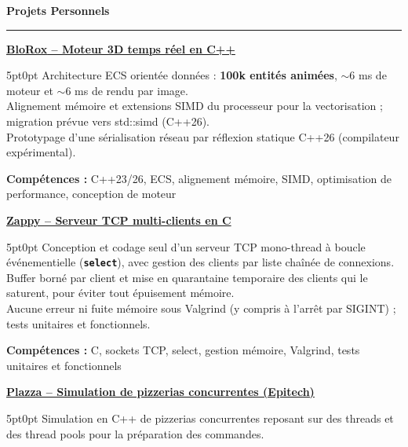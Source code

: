 \documentclass[9pt]{extarticle}
\begin{document}
\par\vspace{5pt}

{\large\bfseries Projets Personnels}
\par\vspace{-8pt}
\rule{\linewidth}{0.4pt}
\par\vspace{5pt}

\underline{\bfseries \href{https://github.com/paulogarithm/blorox}{BloRox} -- Moteur 3D temps réel en C++}
\par
\begin{adjustwidth}{5pt}{0pt}
	Architecture ECS orientée données : {\bfseries 100k entités animées}, $\sim$6 ms de moteur et $\sim$6 ms de rendu par image. \\
	Alignement mémoire et extensions SIMD du processeur pour la vectorisation ; migration prévue vers {\ttfamily std::simd} (C++26). \\
	Prototypage d'une sérialisation réseau par réflexion statique C++26 (compilateur expérimental).
\end{adjustwidth}
\par
{\bfseries Compétences :} C++23/26, ECS, alignement mémoire, SIMD, optimisation de performance, conception de moteur

\par\vspace{8pt}

\underline{\bfseries Zappy -- Serveur TCP multi-clients en C}
\par
\begin{adjustwidth}{5pt}{0pt}
    Conception et codage seul d'un serveur TCP mono-thread à boucle événementielle ({\bfseries \texttt{select}}), avec gestion des clients par liste chaînée de connexions. \\
    Buffer borné par client et mise en quarantaine temporaire des clients qui le saturent, pour éviter tout épuisement mémoire. \\
    Aucune erreur ni fuite mémoire sous Valgrind (y compris à l'arrêt par SIGINT) ; tests unitaires et fonctionnels.
\end{adjustwidth}
\par
{\bfseries Compétences :} C, sockets TCP, select, gestion mémoire, Valgrind, tests unitaires et fonctionnels

\par\vspace{8pt}

\underline{\bfseries Plazza -- Simulation de pizzerias concurrentes (Epitech)}
\par
\begin{adjustwidth}{5pt}{0pt}
    Simulation en C++ de pizzerias concurrentes reposant sur des threads et des thread pools pour la préparation des commandes.
\end{adjustwidth}
\end{document}
